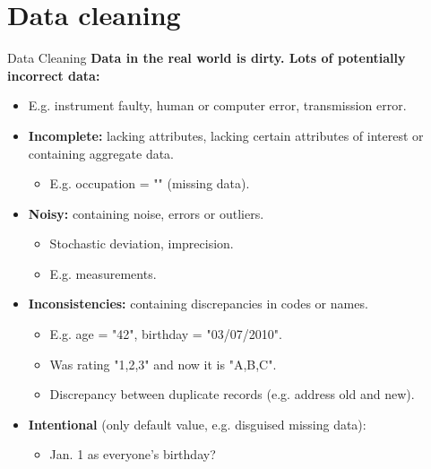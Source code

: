 \section{Data cleaning}

\begin{frame}{Data Cleaning}
	\textbf{Data in the real world is {\color{airforceblue}dirty}. Lots of 
	potentially incorrect data:}
	\begin{itemize}
		\item E.g. instrument faulty, human or computer error, transmission 
		error.
		\item \textbf{\color{airforceblue}Incomplete:} lacking attributes, 
		lacking certain attributes of interest or containing aggregate data.
		\begin{itemize}
			\item E.g. occupation = "" (missing data).
		\end{itemize}
		\item \textbf{\color{airforceblue}Noisy:} containing noise, errors or 
		outliers.
		\begin{itemize}
			\item Stochastic deviation, imprecision.
			\item E.g. measurements.
		\end{itemize}
		\item \textbf{\color{airforceblue}Inconsistencies:} containing 
		discrepancies in codes or names.
		\begin{itemize}
			\item E.g. age = "42", birthday = "03/07/2010".
			\item Was rating "1,2,3" and now it is "A,B,C".
			\item Discrepancy between duplicate records (e.g. address old and 
			new).
		\end{itemize}
		\item \textbf{\color{airforceblue}Intentional} (only default value, 
		e.g. disguised missing data):
		\begin{itemize}
			\item Jan. 1 as everyone's birthday?
		\end{itemize}
	\end{itemize}
\end{frame}

